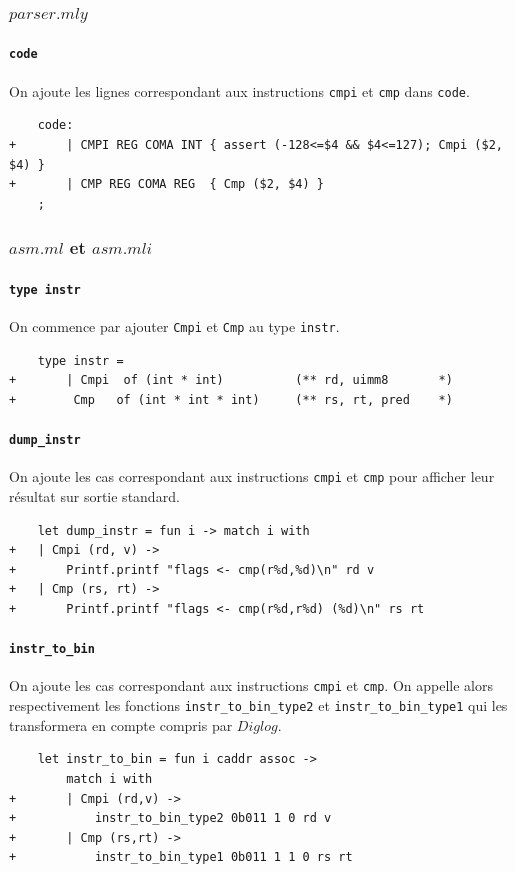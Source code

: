 \documentclass[11pt, a4paper, twoside, titlepage]{article}
\begin{document}
\subsubsection{$parser.mly$}
\paragraph{\texttt{code}}
On ajoute les lignes correspondant aux instructions \texttt{cmpi} et \texttt{cmp} dans \texttt{code}.
\begin{lstlisting}
	code:
+		| CMPI REG COMA INT	{ assert (-128<=$4 && $4<=127); Cmpi ($2, $4) }
+		| CMP REG COMA REG	{ Cmp ($2, $4) }
	;
\end{lstlisting}

\subsubsection{$asm.ml$ et $asm.mli$}
\paragraph{\texttt{type instr}}
On commence par ajouter \texttt{Cmpi} et \texttt{Cmp} au type \texttt{instr}.
\begin{lstlisting}
	type instr =
+		| Cmpi  of (int * int)			(** rd, uimm8		*)
+		 Cmp   of (int * int * int)		(** rs, rt, pred	*)
\end{lstlisting}
\paragraph{\texttt{dump\_instr}}
On ajoute les cas correspondant aux instructions \texttt{cmpi} et \texttt{cmp} pour afficher leur résultat sur sortie standard.
\begin{lstlisting}
	let dump_instr = fun i -> match i with
+	| Cmpi (rd, v) ->
+		Printf.printf "flags <- cmp(r%d,%d)\n" rd v
+	| Cmp (rs, rt) ->
+		Printf.printf "flags <- cmp(r%d,r%d) (%d)\n" rs rt
\end{lstlisting}
\paragraph{\texttt{instr\_to\_bin}}
On ajoute les cas correspondant aux instructions \texttt{cmpi} et \texttt{cmp}. On appelle alors respectivement les fonctions \texttt{instr\_to\_bin\_type2} et \texttt{instr\_to\_bin\_type1} qui les transformera en compte compris par $Diglog$.
\begin{lstlisting}
	let instr_to_bin = fun i caddr assoc ->
		match i with
+		| Cmpi (rd,v) ->
+			instr_to_bin_type2 0b011 1 0 rd v
+		| Cmp (rs,rt) ->
+			instr_to_bin_type1 0b011 1 1 0 rs rt
\end{lstlisting}
\end{document}
